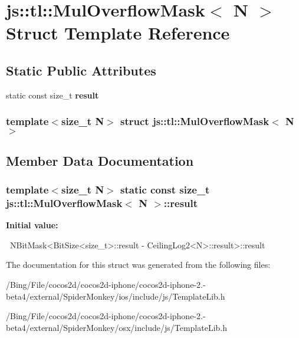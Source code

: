 \hypertarget{structjs_1_1tl_1_1_mul_overflow_mask}{\section{js\-:\-:tl\-:\-:Mul\-Overflow\-Mask$<$ N $>$ Struct Template Reference}
\label{structjs_1_1tl_1_1_mul_overflow_mask}
}
\subsection*{Static Public Attributes}
\begin{DoxyCompactItemize}
\item 
static const size\-\_\-t {\bfseries result}
\end{DoxyCompactItemize}
\subsubsection*{template$<$size\-\_\-t N$>$ struct js\-::tl\-::\-Mul\-Overflow\-Mask$<$ N $>$}



\subsection{Member Data Documentation}
\hypertarget{structjs_1_1tl_1_1_mul_overflow_mask_a6725de6187e72e853849b2632ec30456}{
\subsubsection[{result}]{\setlength{\rightskip}{0pt plus 5cm}template$<$size\-\_\-t N$>$ static const size\-\_\-t {\bf js\-::tl\-::\-Mul\-Overflow\-Mask}$<$ N $>$\-::result}}\label{structjs_1_1tl_1_1_mul_overflow_mask_a6725de6187e72e853849b2632ec30456}
{\bfseries Initial value\-:}
\begin{DoxyCode}

        ~NBitMask<BitSize<size_t>::result - CeilingLog2<N>::result>::result
\end{DoxyCode}


The documentation for this struct was generated from the following files\-:\begin{DoxyCompactItemize}
\item 
/\-Bing/\-File/cocos2d/cocos2d-\/iphone/cocos2d-\/iphone-\/2.-\/beta4/external/\-Spider\-Monkey/ios/include/js/Template\-Lib.\-h\item 
/\-Bing/\-File/cocos2d/cocos2d-\/iphone/cocos2d-\/iphone-\/2.-\/beta4/external/\-Spider\-Monkey/osx/include/js/Template\-Lib.\-h\end{DoxyCompactItemize}
